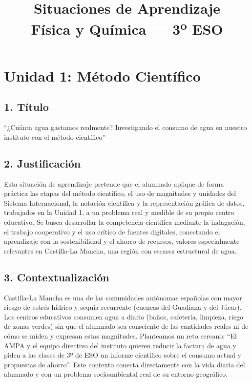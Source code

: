 \documentclass[11pt,a4paper]{article}
\title{\vspace{-1.5cm}\textbf{Situaciones de Aprendizaje}\\[4pt]\Large Física y Química --- 3\textsuperscript{o} ESO}
\author{}
\date{}
\begin{document}
\maketitle
\tableofcontents

\newpage
\section{Unidad 1: Método Científico}
\subsection*{1. Título}
``¿Cuánta agua gastamos realmente? Investigando el consumo de agua en nuestro instituto con el método científico''

\subsection*{2. Justificación}
Esta situación de aprendizaje pretende que el alumnado aplique de forma práctica las etapas del método científico, el uso de magnitudes y unidades del Sistema Internacional, la notación científica y la representación gráfica de datos, trabajados en la Unidad 1, a un problema real y medible de su propio centro educativo. Se busca desarrollar la competencia científica mediante la indagación, el trabajo cooperativo y el uso crítico de fuentes digitales, conectando el aprendizaje con la sostenibilidad y el ahorro de recursos, valores especialmente relevantes en Castilla-La Mancha, una región con escasez estructural de agua.

\subsection*{3. Contextualización}
Castilla-La Mancha es una de las comunidades autónomas españolas con mayor riesgo de estrés hídrico y sequía recurrente (cuencas del Guadiana y del Júcar). Los centros educativos consumen agua a diario (baños, cafetería, limpieza, riego de zonas verdes) sin que el alumnado sea consciente de las cantidades reales ni de cómo se miden y expresan estas magnitudes. Planteamos un reto cercano: ``El AMPA y el equipo directivo del instituto quieren reducir la factura de agua y piden a las clases de 3º de ESO un informe científico sobre el consumo actual y propuestas de ahorro''. Este contexto conecta directamente con la vida diaria del alumnado y con un problema socioambiental real de su entorno geográfico.
\end{document}
